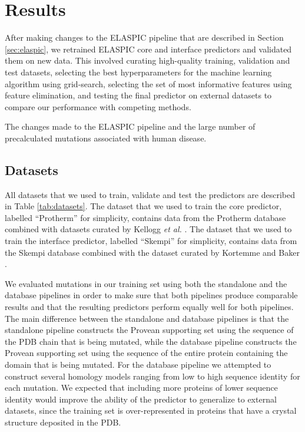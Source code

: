 
\chapter{Results} \label{ch:results}

After making changes to the ELASPIC pipeline that are described in Section \ref{sec:elaspic}, we retrained ELASPIC core and interface predictors and validated them on new data. This involved curating high-quality training, validation and test datasets, selecting the best hyperparameters for the machine learning algorithm using grid-search, selecting the set of most informative features using feature elimination, and testing the final predictor on external datasets to compare our performance with competing methods.

The changes made to the ELASPIC pipeline and the large number of precalculated mutations associated with human disease.



\section{Datasets}

All datasets that we used to train, validate and test the predictors are described in Table \ref{tab:datasets}. The dataset that we used to train the core predictor, labelled ``Protherm'' for simplicity, contains data from the Protherm database \cite{bava_protherm_2004} combined with datasets curated by Kellogg \textit{et al.} \cite{kellogg_role_2011}. The dataset that we used to train the interface predictor, labelled ``Skempi'' for simplicity, contains data from the Skempi database \cite{moal_skempi:_2012} combined with the dataset curated by Kortemme and Baker \cite{kortemme_simple_2002}.

We evaluated mutations in our training set using both the standalone and the database pipelines in order to make sure that both pipelines produce comparable results and that the resulting predictors perform equally well for both pipelines. The main difference between the standalone and database pipelines is that the standalone pipeline constructs the Provean supporting set using the sequence of the PDB chain that is being mutated, while the database pipeline constructs the Provean supporting set using the sequence of the entire protein containing the domain that is being mutated. For the database pipeline we attempted to construct several homology models ranging from low to high sequence identity for each mutation. We expected that including more proteins of lower sequence identity would improve the ability of the predictor to generalize to external datasets, since the training set is over-represented in proteins that have a crystal structure deposited in the PDB.

